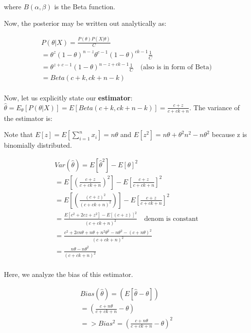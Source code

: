       where $B(\alpha, \beta)$ is the Beta function. 

      Now, the posterior may be written out analytically as:

      \begin{align*}
        P(\theta | X) = \frac{P(\theta) P(X | \theta)}{C} \\
        = \theta^z (1-\theta)^{n-z} \theta^{c - 1} (1 - \theta)^{ck - 1} \frac{1}{C} \\
        = \theta^{z+c-1} (1-\theta)^{n-z+ck-1} \frac{1}{C} \quad \text{(also is in form of Beta)} \\
        = Beta(c+k, ck+n-k)\\
      \end{align*}

      Now, let us explicitly state our \textbf{estimator}: $\hat{\theta} = E_\theta[ P(\theta | X) ] = E[ Beta(c+k, ck+n-k) ] = \frac{c+z}{c + ck + n}$. The variance of the estimator is:

      Note that $E[z] = E[\sum_{i=1}^n x_i] = n\theta$ and $E[z^2] = n\theta + \theta^2n^2 - n\theta^2$ because z is binomially distributed.

      \begin{align*}
          Var(\hat{\theta}) = E[\hat{\theta}^2] - E[\theta]^2 \\
            = E[(\frac{c+z}{c + ck + n})^2] - E[\frac{c+z}{c + ck + n}]^2 \\
            = E[(\frac{(c+z)^2}{(c + ck + n)^2})] - E[\frac{c+z}{c + ck + n}]^2 \\
            = \frac{E[c^2+2cz+z^2] - E[(c+z)]^2}{(c + ck + n)^2} \quad \text{denom is constant} \\
            = \frac{c^2 + 2cn\theta + n\theta + n^2\theta^2 - n\theta^2 - (c+n\theta)^2}{(c + ck + n)^2} \\
            = \frac{n\theta - n\theta^2}{(c + ck + n)^2} \\
      \end{align*}

      Here, we analyze the bias of this estimator.

      \begin{align*}
          Bias(\hat{\theta}) = (E[\hat{\theta} - \theta]) \\
            = (\frac{c+n\theta}{c + ck + n} - \theta) \\
            => Bias^2 = (\frac{c+n\theta}{c + ck + n} - \theta)^2
      \end{align*}

